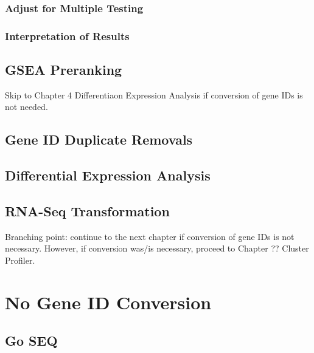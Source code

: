\documentclass[
]{book}
\begin{document}
\hypertarget{adjust-for-multiple-testing}{%
\section{Adjust for Multiple Testing}\label{adjust-for-multiple-testing}}

\hypertarget{interpretation-of-results}{%
\section{Interpretation of Results}\label{interpretation-of-results}}

\hypertarget{gsea-preranking}{%
\chapter{GSEA Preranking}\label{gsea-preranking}}

Skip to Chapter 4 Differentiaon Expression Analysis if conversion of gene IDs is not needed.

\hypertarget{gene-id-duplicate-removals}{%
\chapter{Gene ID Duplicate Removals}\label{gene-id-duplicate-removals}}

\hypertarget{differential-expression-analysis}{%
\chapter{Differential Expression Analysis}\label{differential-expression-analysis}}

\hypertarget{rna-seq-transformation}{%
\chapter{RNA-Seq Transformation}\label{rna-seq-transformation}}

Branching point: continue to the next chapter if conversion of gene IDs is not necessary. However, if conversion was/is necessary, proceed to Chapter ?? Cluster Profiler.

\hypertarget{part-no-gene-id-conversion}{%
\part{No Gene ID Conversion}\label{part-no-gene-id-conversion}}

\hypertarget{go-seq}{%
\chapter{Go SEQ}\label{go-seq}}
\end{document}
